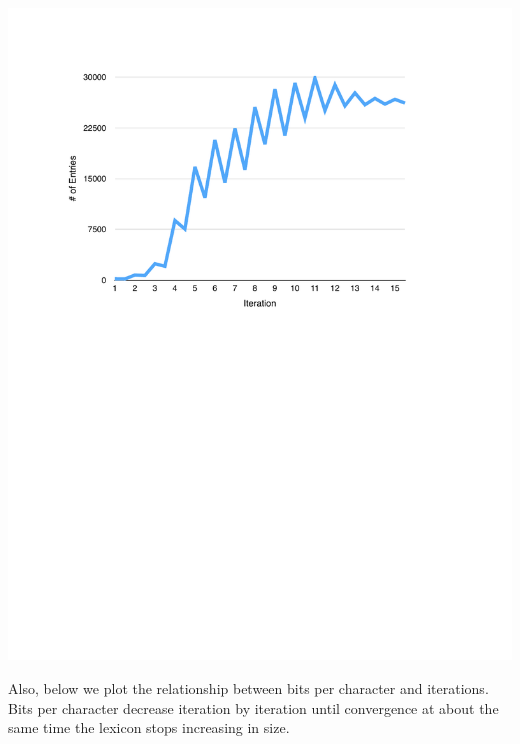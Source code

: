 \documentclass[11pt, oneside, fleqn]{article}
\begin{document}
	\vspace{1em}
  \includegraphics[scale=1.0]{./figure/lexicon_size_per_iteration}

	\pagebreak

  Also, below we plot the relationship between bits per character and iterations. Bits per character decrease iteration by iteration until convergence at about the same time the lexicon stops increasing in size.
\end{document}
